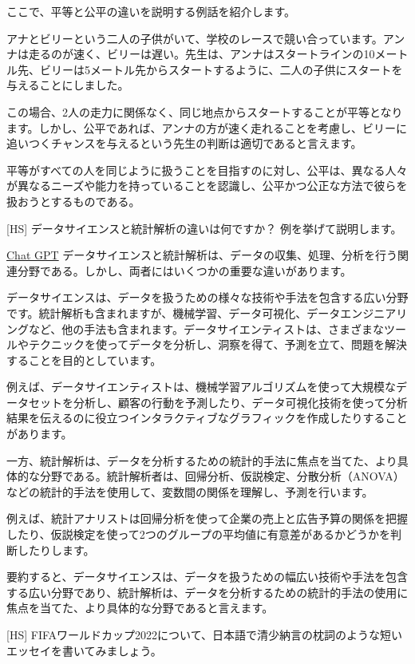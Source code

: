 \documentclass[
]{book}
\theoremstyle{definition}
\theoremstyle{definition}
\theoremstyle{definition}
\theoremstyle{definition}
\theoremstyle{remark}
\begin{document}
ここで、平等と公平の違いを説明する例話を紹介します。

アナとビリーという二人の子供がいて、学校のレースで競い合っています。アンナは走るのが速く、ビリーは遅い。先生は、アンナはスタートラインの10メートル先、ビリーは5メートル先からスタートするように、二人の子供にスタートを与えることにしました。

この場合、2人の走力に関係なく、同じ地点からスタートすることが平等となります。しかし、公平であれば、アンナの方が速く走れることを考慮し、ビリーに追いつくチャンスを与えるという先生の判断は適切であると言えます。

平等がすべての人を同じように扱うことを目指すのに対し、公平は、異なる人々が異なるニーズや能力を持っていることを認識し、公平かつ公正な方法で彼らを扱おうとするものである。

{[}HS{]} データサイエンスと統計解析の違いは何ですか？ 例を挙げて説明します。

\protect\hyperlink{chatgpt}{Chat GPT} データサイエンスと統計解析は、データの収集、処理、分析を行う関連分野である。しかし、両者にはいくつかの重要な違いがあります。

データサイエンスは、データを扱うための様々な技術や手法を包含する広い分野です。統計解析も含まれますが、機械学習、データ可視化、データエンジニアリングなど、他の手法も含まれます。データサイエンティストは、さまざまなツールやテクニックを使ってデータを分析し、洞察を得て、予測を立て、問題を解決することを目的としています。

例えば、データサイエンティストは、機械学習アルゴリズムを使って大規模なデータセットを分析し、顧客の行動を予測したり、データ可視化技術を使って分析結果を伝えるのに役立つインタラクティブなグラフィックを作成したりすることがあります。

一方、統計解析は、データを分析するための統計的手法に焦点を当てた、より具体的な分野である。統計解析者は、回帰分析、仮説検定、分散分析（ANOVA）などの統計的手法を使用して、変数間の関係を理解し、予測を行います。

例えば、統計アナリストは回帰分析を使って企業の売上と広告予算の関係を把握したり、仮説検定を使って2つのグループの平均値に有意差があるかどうかを判断したりします。

要約すると、データサイエンスは、データを扱うための幅広い技術や手法を包含する広い分野であり、統計解析は、データを分析するための統計的手法の使用に焦点を当てた、より具体的な分野であると言えます。

{[}HS{]} FIFAワールドカップ2022について、日本語で清少納言の枕詞のような短いエッセイを書いてみましょう。
\end{document}
